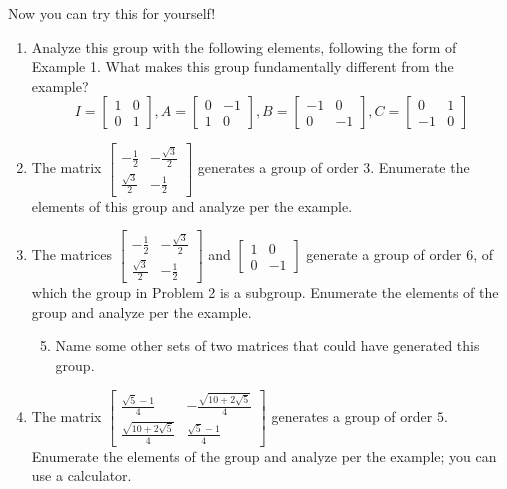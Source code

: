 \documentclass[../textbook.tex]{subfiles}
\begin{document}
\noindent Now you can try this for yourself!
\begin{enumerate}
\item Analyze this group with the following elements, following the form of Example 1. What makes this group fundamentally different from the example?
$$I=\left[\begin{array}{cc} 1 & 0 \\ 0 & 1 \end{array}\right], A=\left[\begin{array}{cc} 0 & -1 \\ 1 & 0 \end{array}\right], B=\left[\begin{array}{cc} -1 & 0 \\ 0 & -1 \end{array}\right], C=\left[\begin{array}{cc} 0 & 1 \\ -1 & 0 \end{array}\right]$$
\item The matrix $\left[\begin{array}{cc} -\frac{1}{2} & -\frac{\sqrt{3}}{2} \\ \frac{\sqrt{3}}{2} & -\frac{1}{2}\end{array}\right]$ generates a group of order $3$. Enumerate the elements of this group and analyze per the example.
\item The matrices $\left[\begin{array}{cc} -\frac{1}{2} & -\frac{\sqrt{3}}{2} \\ \frac{\sqrt{3}}{2} & -\frac{1}{2}\end{array}\right]$ and $\left[\begin{array}{cc} 1 & 0 \\ 0 & -1 \end{array}\right]$ generate a group of order $6$, of which the group in Problem 2 is a subgroup. Enumerate the elements of the group and analyze per the example.
\begin{enumerate}
\setcounter{enumii}{4}
\item Name some other sets of two matrices that could have generated this group.
\end{enumerate}
\item The matrix $\left[\begin{array}{cc} \frac{\sqrt{5}-1}{4} & -\frac{\sqrt{10+2\sqrt{5}}}{4} \\ \frac{\sqrt{10+2\sqrt{5}}}{4} & \frac{\sqrt{5}-1}{4} \end{array}\right]$ generates a group of order $5$. Enumerate the elements of the group and analyze per the example; you can use a calculator.

\end{enumerate}
\end{document}
